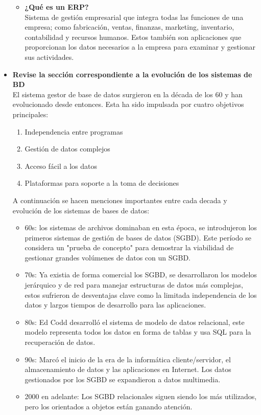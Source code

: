 \documentclass[letterpaper,12pt]{article}
\begin{document}
\begin{sloppypar}
\begin{itemize}
\begin{itemize}
\begin{itemize}
        \end{itemize}
        \item \textbf{¿Qué es un ERP?} \\ Sistema de gestión empresarial que integra todas las funciones de una empresa; como fabricación, ventas, finanzas, marketing, inventario, contabilidad y recursos humanos. Estos también son aplicaciones que proporcionan los datos necesarios a la empresa para examinar y gestionar sus actividades.
    \end{itemize}
    \item \textbf{Revise la sección correspondiente a la evolución de los sistemas de BD} \\ El sistema gestor de base de datos surgieron en la década de los 60 y han evolucionado desde entonces. Esta ha sido impulsada por cuatro objetivos principales:
    \begin{enumerate}
        \item Independencia entre programas
        \item Gestión de datos complejos
        \item Acceso fácil a los datos
        \item Plataformas para soporte a la toma de decisiones
    \end{enumerate}
    A continuación se hacen menciones importantes entre cada decada y evolución de los sistemas de bases de datos:

    \begin{itemize}
        \item 60s: los sistemas de archivos dominaban en esta época, se introdujeron los primeros sistemas de gestión de bases de datos (SGBD). Este período se considera un "prueba de concepto" para demostrar la viabilidad de gestionar grandes volúmenes de datos con un SGBD.
        \item 70s: Ya existia de forma comercial los SGBD, se desarrollaron los modelos jerárquico y de red para manejar estructuras de datos más complejas, estos sufrieron de desventajas clave como la limitada independencia de los datos y largos tiempos de desarrollo para las aplicaciones.
        \item 80s: Ed Codd desarrolló el sistema de modelo de datos relacional, este modelo representa todos los datos en forma de tablas y usa SQL para la recuperación de datos.
        \item 90s: Marcó el inicio de la era de la informática cliente/servidor, el almacenamiento de datos y las aplicaciones en Internet. Los datos gestionados por los SGBD se expandieron a datos multimedia.
        \item 2000 en adelante: Los SGBD relacionales siguen siendo los más utilizados, pero los orientados a objetos están ganando atención.
    \end{itemize}



\end{itemize}
\end{sloppypar}
\end{document}
